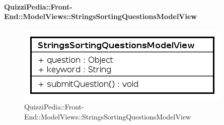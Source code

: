 \paragraph[QuizziPedia::Front-End::ModelViews\\::StringsSortingQuestionsModelView]{QuizziPedia::Front-End::ModelViews::StringsSortingQuestionsModelView}
\begin{figure} [ht]
	\centering
	\includegraphics[scale=0.80]{UML/Classi/Front-End/QuizziPedia_Front-end_ModelView_StringsSortingQuestionsModelView.png}
	\caption{QuizziPedia::Front-End::ModelViews::StringsSortingQuestionsModelView}
\end{figure} \FloatBarrier
